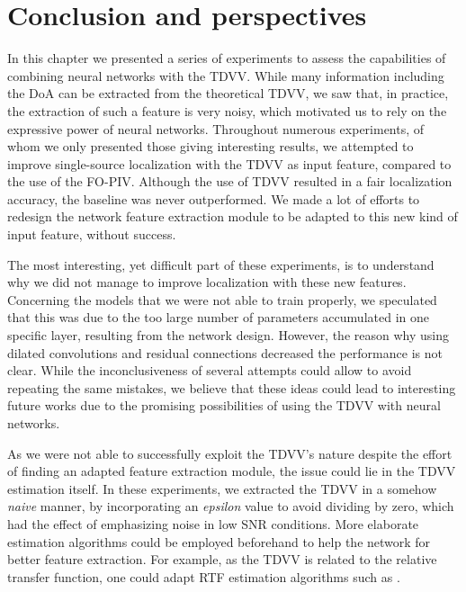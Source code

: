 \clearpage
\section{Conclusion and perspectives}

In this chapter we presented a series of experiments to assess the capabilities of combining neural networks with the TDVV. While many information including the DoA can be extracted from the theoretical TDVV, we saw that, in practice, the extraction of such a feature is very noisy, which motivated us to rely on the expressive power of neural networks. Throughout numerous experiments, of whom we only presented those giving interesting results, we attempted to improve single-source localization with the TDVV as input feature, compared to the use of the FO-PIV. Although the use of TDVV resulted in a fair localization accuracy, the baseline was never outperformed. We made a lot of efforts to redesign the network feature extraction module to be adapted to this new kind of input feature, without success.

The most interesting, yet difficult part of these experiments, is to understand why we did not manage to improve localization with these new features. Concerning the models that we were not able to train properly, we speculated that this was due to the too large number of parameters accumulated in one specific layer, resulting from the network design. However, the reason why using dilated convolutions and residual connections decreased the performance is not clear. While the inconclusiveness of several attempts could allow to avoid repeating the same mistakes, we believe that these ideas could lead to interesting future works due to the promising possibilities of using the TDVV with neural networks.

As we were not able to successfully exploit the TDVV's nature despite the effort of finding an adapted feature extraction module, the issue could lie in the TDVV estimation itself. In these experiments, we extracted the TDVV in a somehow \textit{naive} manner, by incorporating an \textit{epsilon} value to avoid dividing by zero, which had the effect of emphasizing noise in low SNR conditions. More elaborate estimation algorithms could be employed beforehand to help the network for better feature extraction. For example, as the TDVV is related to the relative transfer function, one could adapt RTF estimation algorithms such as \cite{shalvi_system_1996, cohen_relative_2004, gannot_signal_2001}. 

